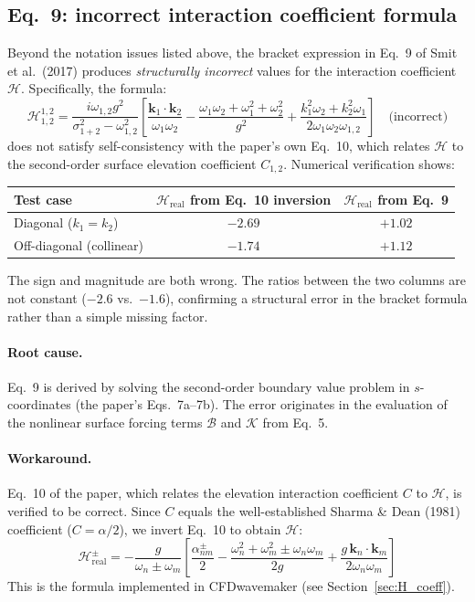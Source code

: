 \documentclass{ol-softwaremanual}
\begin{document}
\subsection{Eq.~9: incorrect interaction coefficient formula}
\label{app:eq9_error}

Beyond the notation issues listed above, the bracket expression in Eq.~9 of Smit et al.\ (2017) produces \emph{structurally incorrect} values for the interaction coefficient $\mathscr{H}$. Specifically, the formula:
\begin{equation}
\mathscr{H}_{1,2}^{1,2} = \frac{i\omega_{1,2}g^2}{\sigma_{1+2}^2 - \omega_{1,2}^2}\left[\frac{\mathbf{k}_1\cdot\mathbf{k}_2}{\omega_1\omega_2} - \frac{\omega_1\omega_2 + \omega_1^2 + \omega_2^2}{g^2} + \frac{k_1^2\omega_2 + k_2^2\omega_1}{2\omega_1\omega_2\omega_{1,2}}\right] \quad\text{(incorrect)}
\end{equation}
does not satisfy self-consistency with the paper's own Eq.~10, which relates $\mathscr{H}$ to the second-order surface elevation coefficient $C_{1,2}$. Numerical verification shows:

\begin{center}
\begin{tabular}{lcc}
\toprule
Test case & $\mathscr{H}_\mathrm{real}$ from Eq.~10 inversion & $\mathscr{H}_\mathrm{real}$ from Eq.~9 \\
\midrule
Diagonal ($k_1 = k_2$) & $-2.69$ & $+1.02$ \\
Off-diagonal (collinear) & $-1.74$ & $+1.12$ \\
\bottomrule
\end{tabular}
\end{center}

The sign and magnitude are both wrong. The ratios between the two columns are not constant ($-2.6$ vs.\ $-1.6$), confirming a structural error in the bracket formula rather than a simple missing factor.

\paragraph{Root cause.} Eq.~9 is derived by solving the second-order boundary value problem in $s$-coordinates (the paper's Eqs.~7a--7b). The error originates in the evaluation of the nonlinear surface forcing terms $\mathscr{B}$ and $\mathscr{K}$ from Eq.~5.

\paragraph{Workaround.} Eq.~10 of the paper, which relates the elevation interaction coefficient $C$ to $\mathscr{H}$, is verified to be correct. Since $C$ equals the well-established Sharma \& Dean (1981) coefficient ($C = \alpha/2$), we invert Eq.~10 to obtain $\mathscr{H}$:
\begin{equation}
\mathscr{H}_\mathrm{real}^{\pm} = -\frac{g}{\omega_n \pm \omega_m}\left[\frac{\alpha_{nm}^\pm}{2} - \frac{\omega_n^2 + \omega_m^2 \pm \omega_n\omega_m}{2g} + \frac{g\,\mathbf{k}_n\cdot\mathbf{k}_m}{2\omega_n\omega_m}\right]
\end{equation}
This is the formula implemented in CFDwavemaker (see Section~\ref{sec:H_coeff}).
\end{document}
